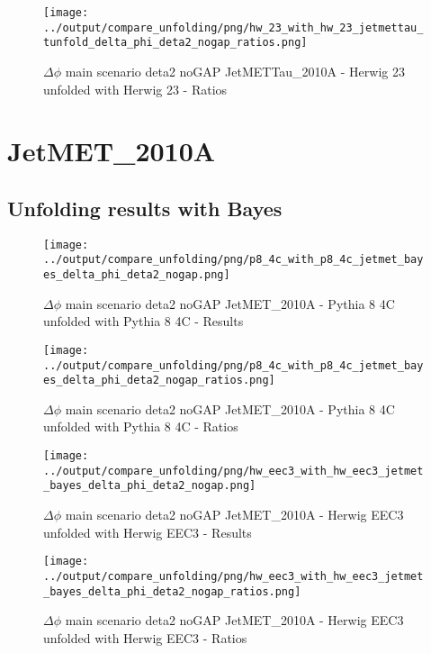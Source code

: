 \documentclass[11pt]{book}
\begin{document}
\begin{figure}[ht]
\centering
\texttt{[image: ../output/compare\_unfolding/png/hw\_23\_with\_hw\_23\_jetmettau\_tunfold\_delta\_phi\_deta2\_nogap\_ratios.png]}
\caption{$\Delta\phi$ main scenario deta2 noGAP JetMETTau\_2010A - Herwig 23 unfolded with Herwig 23 - Ratios}
\label{hw_23_hw_23_jetmettau_tunfold_delta_phi_deta2_nogap_b}
\end{figure}


\clearpage
\section{JetMET\_2010A}
\subsection{Unfolding results with Bayes}

\begin{figure}[ht]
\centering
\texttt{[image: ../output/compare\_unfolding/png/p8\_4c\_with\_p8\_4c\_jetmet\_bayes\_delta\_phi\_deta2\_nogap.png]}
\caption{$\Delta\phi$ main scenario deta2 noGAP JetMET\_2010A - Pythia 8 4C unfolded with Pythia 8 4C - Results}
\label{p8_p8_jetmet_bayes_delta_phi_deta2_nogap_a}
\end{figure}

\begin{figure}[ht]
\centering
\texttt{[image: ../output/compare\_unfolding/png/p8\_4c\_with\_p8\_4c\_jetmet\_bayes\_delta\_phi\_deta2\_nogap\_ratios.png]}
\caption{$\Delta\phi$ main scenario deta2 noGAP JetMET\_2010A - Pythia 8 4C unfolded with Pythia 8 4C - Ratios}
\label{p8_p8_jetmet_bayes_delta_phi_deta2_nogap_b}
\end{figure}

\begin{figure}[ht]
\centering
\texttt{[image: ../output/compare\_unfolding/png/hw\_eec3\_with\_hw\_eec3\_jetmet\_bayes\_delta\_phi\_deta2\_nogap.png]}
\caption{$\Delta\phi$ main scenario deta2 noGAP JetMET\_2010A - Herwig EEC3 unfolded with Herwig EEC3 - Results}
\label{hw_eec3_hw_eec3_jetmet_bayes_delta_phi_deta2_nogap_a}
\end{figure}

\begin{figure}[ht]
\centering
\texttt{[image: ../output/compare\_unfolding/png/hw\_eec3\_with\_hw\_eec3\_jetmet\_bayes\_delta\_phi\_deta2\_nogap\_ratios.png]}
\caption{$\Delta\phi$ main scenario deta2 noGAP JetMET\_2010A - Herwig EEC3 unfolded with Herwig EEC3 - Ratios}
\label{hw_eec3_hw_eec3_jetmet_bayes_delta_phi_deta2_nogap_b}
\end{figure}
\end{document}
